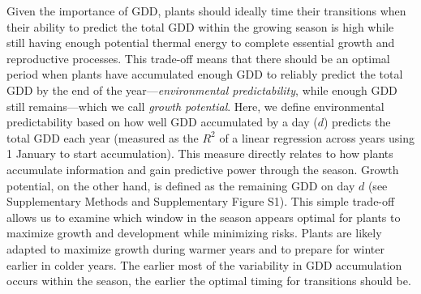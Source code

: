 \documentclass[11pt,letter]{article}
\begin{document}
Given the importance of GDD, plants should ideally time their transitions when their ability to predict the total GDD within the growing season is high while still having enough potential thermal energy to complete essential growth and reproductive processes. This trade-off means that there should be an optimal period when plants have accumulated enough GDD
to reliably predict the total GDD by the end of the year---\emph{environmental predictability}, while enough GDD still remains---which we call \emph{growth potential}. Here, we define environmental predictability based on how well GDD accumulated by a day ($d$) predicts the total GDD 
each year (measured as the $R^2$ of a linear regression across years using 1 January to start accumulation). This measure directly relates to how plants accumulate information and gain predictive power through the season. %
Growth potential, on the other hand, is defined as the remaining GDD on day $d$ (see Supplementary Methods and Supplementary Figure S1). %
This simple 
trade-off
allows us to examine which window in the season appears optimal for plants to maximize growth and development while minimizing risks.
Plants are likely adapted to maximize growth during warmer years and to prepare for winter earlier in colder years. 
The earlier most of the variability in GDD accumulation occurs within the season, the earlier the optimal timing for transitions should be.
\end{document}
